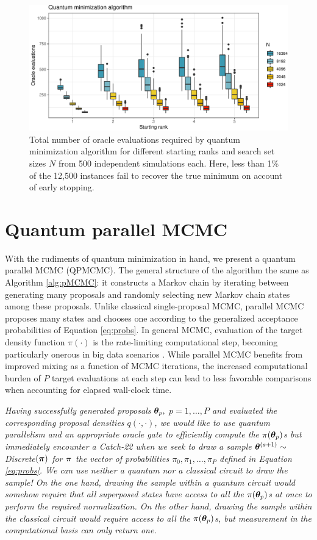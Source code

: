 \documentclass[12pt]{article} %
\begin{document}
 \begin{figure}[!t]
	\centering
	\includegraphics[width=0.7\linewidth]{qMinAlg.pdf}
	\caption{Total number of oracle evaluations required by quantum minimization algorithm \citep{durr1996quantum} for different starting ranks and search set sizes $N$ from 500 independent simulations each.  Here, less than 1\% of the 12,500 instances fail to recover the true minimum on account of early stopping.}\label{fig:qMinAlg}
\end{figure}

\section{Quantum parallel MCMC}\label{sec:qpmcmc}

With the rudiments of quantum minimization in hand, we present a quantum parallel MCMC (QPMCMC). The general structure of the algorithm the same as Algorithm \ref{alg:pMCMC}: it constructs a Markov chain by iterating between generating many proposals and randomly selecting new Markov chain states among these proposals.  Unlike classical single-proposal MCMC, parallel MCMC proposes many states and chooses one according to the generalized acceptance probabilities of Equation \eqref{eq:probs}.
 In general MCMC, evaluation of the target density function $\pi(\cdot)$ is the rate-limiting computational step, becoming particularly onerous in big data scenarios \citep{massive}.  While parallel MCMC benefits from improved mixing as a function of MCMC iterations, the increased computational burden of $P$ target evaluations at each step can lead to less favorable comparisons when accounting for elapsed wall-clock time.
 
 \emph{Having successfully generated proposals $\boldsymbol{\theta}_p,$ $p=1,\dots,P$ and evaluated the corresponding proposal densities $q(\cdot,\cdot)$, we would like to use quantum parallelism and an appropriate oracle gate to efficiently compute the $\pi(\boldsymbol{\theta}_p)$s but immediately encounter a Catch-22 when we seek to draw a sample $\boldsymbol{\theta}^{(s+1)} \sim$ \emph{Discrete}$(\boldsymbol{\pi})$ for $\boldsymbol{\pi}$ the vector of probabilities $\pi_0,\pi_1,\dots,\pi_P$ defined in Equation \eqref{eq:probs}.  We can use neither a quantum nor a classical circuit to draw the sample! On the one hand, drawing the sample within a quantum circuit would somehow require that all superposed states have access to all the $\pi(\boldsymbol{\theta}_p)$s at once to perform the required normalization.  On the other hand, drawing the sample within the classical circuit would require access to all the $\pi(\boldsymbol{\theta}_p)$s, but measurement in the computational basis can only return one.}  
 
\end{document}
